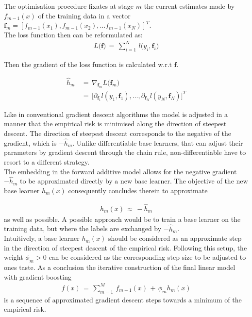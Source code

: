 \documentclass[a4paper, 11pt]{article}
\begin{document}
The optimisation procedure fixates at stage $m$ the current estimates made by $f_{m-1}(x)$ of the training data in a vector $\mathbf{f}_m = [f_{m-1}(x_1), f_{m-1}(x_2), \ldots f_{m-1}(x_N)]^T$. \\

The loss function then can be reformulated as:
\begin{align*}
L\big(\mathbf{f}\big)\, =\, \sum_{i = 1}^{N}\, l\big(y_i, \mathbf{f}_i\big)
\end{align*}

Then the gradient of the loss function is calculated w.r.t $\mathbf{f}$.

\begin{align*}
\hat{h}_m\, &=\, \nabla_{\mathbf{f}_m}L\big(\mathbf{f}_m\big) \\
&=\, \big[\partial_{\mathbf{f}_1} l(y_1, \mathbf{f}_1),\ldots, \partial_{\mathbf{f}_N} l(y_N, \mathbf{f}_N)\big]^T
\end{align*}

Like in conventional gradient descent algorithms the model is adjusted in a manner that the empirical risk is minimised along the direction of steepest descent. The direction of steepest descent corresponds to the negative of the gradient, which is $- \hat{h}_m$. Unlike differentiable base learners, that can adjust their parameters by gradient descent through the chain rule, non-differentiable have to resort to a different strategy.\\
The embedding in the forward additive model allows for the negative gradient $-\hat{h}_m$ to be approximated directly by a new base learner. The objective of the new base learner $h_m(x)$ consequently concludes therein to approximate

\begin{align*}
h_m(x)\, \approx\, -\hat{h}_m
\end{align*}
as well as possible. A possible approach would be to train a base learner on the training data, but where the labels are exchanged by $-\hat{h}_m$.\\
Intuitively, a base learner $h_m(x)$ should be considered as an approximate step in the direction of steepest descent of the empirical risk. Following this setup, the weight $\phi_m > 0$ can be considered as the corresponding step size to be adjusted to ones taste. As a conclusion the iterative construction of the final linear model with gradient boosting
\begin{align*}
f(x)\, =\, \sum_{m=1}^{M}\, f_{m-1}(x)\, +\, \phi_m h_m(x)
\end{align*}
is a sequence of approximated gradient descent steps towards a minimum of the empirical risk. 
\end{document}
